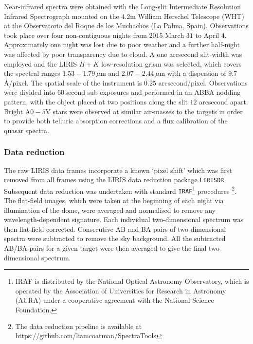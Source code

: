 Near-infrared spectra were obtained with the Long-slit Intermediate Resolution Infrared Spectrograph \citep[LIRIS;][]{manchado98} mounted on the 4.2m William Herschel Telescope (WHT) at the Observatorio del Roque de los Muchachos (La Palma, Spain). 
Observations took place over four non-contiguous nights from $2015$ March $31$ to April $4$. 
Approximately one night was lost due to poor weather and a further half-night was affected by poor transparency due to cloud. 
A one arcsecond slit-width was employed and the LIRIS $H+K$ low-resolution grism was selected, which covers the spectral ranges $1.53-1.79$\,$\mu$m and $2.07-2.44$\,$\mu$m with a dispersion of $9.7$\,\AA/pixel. 
The spatial scale of the instrument is $0.25$ arcsecond/pixel. 
Observations were divided into 60\,second sub-exposures and performed in an ABBA nodding pattern, with the object placed at two positions along the slit $12$ arcsecond apart. 
Bright A$0-5$V stars were observed at similar air-masses to the targets in order to provide both telluric absorption corrections and a flux calibration of the quasar spectra.

\subsubsection{Data reduction}

The raw LIRIS data frames incorporate a known `pixel shift' which was first removed from all frames using the LIRIS data reduction package {\tt LIRISDR}. 
Subsequent data reduction was undertaken with standard {\tt IRAF}\footnote{IRAF is distributed by the National Optical Astronomy Observatory, which is operated by the Association of Universities for Research in Astronomy (AURA) under a cooperative agreement with the National Science Foundation.} procedures \footnote{The data reduction pipeline is available at https://github.com/liamcoatman/SpectraTools}.  
The flat-field images, which were taken at the beginning of each night via illumination of the dome, were averaged and normalised to remove any wavelength-dependent signature. 
Each individual two-dimensional spectrum was then flat-field corrected. 
Consecutive AB and BA pairs of two-dimensional spectra were subtracted to remove the sky background. 
All the subtracted AB/BA-pairs for a given target were then averaged to give the final two-dimensional spectrum.

